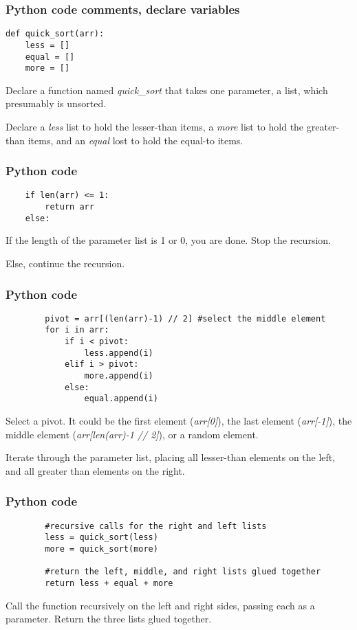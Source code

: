 \documentclass{beamer}
\begin{document}
    \begin{frame}[fragile]
        \frametitle{Python code comments, declare variables}
        \begin{verbatim}
def quick_sort(arr):
    less = []
    equal = []
    more = []
        \end{verbatim}
        \par Declare a function named \textit{quick\_sort} that takes one parameter, a list, which presumably is unsorted.
        \par Declare a \textit{less} list to hold the lesser-than items, a \textit{more} list to hold the greater-than items, and an \textit{equal} lost to hold the equal-to items.
    \end{frame}

    \begin{frame}[fragile]
        \frametitle{Python code}
        \footnotesize
        \begin{verbatim}
    if len(arr) <= 1:
        return arr
    else:
        \end{verbatim}
        \par If the length of the parameter list is 1 or 0, you are done. Stop the recursion.
        \par Else, continue the recursion.
    \end{frame}

    \begin{frame}[fragile]
        \frametitle{Python code}
        \footnotesize
        \begin{verbatim}
        pivot = arr[(len(arr)-1) // 2] #select the middle element
        for i in arr:
            if i < pivot:           
                less.append(i)
            elif i > pivot:
                more.append(i)
            else:
                equal.append(i)
        \end{verbatim}
        \par Select a pivot. It could be the first element (\textit{arr[0]}), the last element (\textit{arr[-1]}), the middle element (\textit{arr[len(arr)-1 // 2]}), or a random element.
        \par Iterate through the parameter list, placing all lesser-than elements on the left, and all greater than elements on the right.
    \end{frame}

    \begin{frame}[fragile]
        \frametitle{Python code}
        \footnotesize
        \begin{verbatim}
        #recursive calls for the right and left lists
        less = quick_sort(less)
        more = quick_sort(more)

        #return the left, middle, and right lists glued together
        return less + equal + more
        \end{verbatim}
        \par Call the function recursively on the left and right sides, passing each as a parameter. Return the three lists glued together.
    \end{frame}
\end{document}
